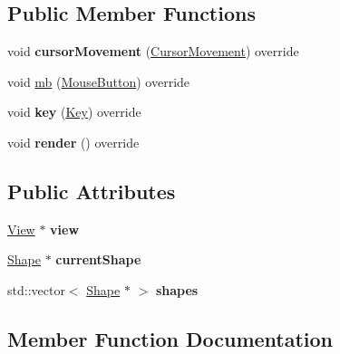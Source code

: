 \subsection*{Public Member Functions}
\begin{DoxyCompactItemize}
\item 
void {\bfseries cursor\+Movement} (\hyperlink{classCursorMovement}{Cursor\+Movement}) override\hypertarget{classComposer_a50e1533adec6e7b920d7092c1283f5b3}{}\label{classComposer_a50e1533adec6e7b920d7092c1283f5b3}

\item 
void \hyperlink{classComposer_aeccddfa85500c2e3a517058611ccca6a}{mb} (\hyperlink{classMouseButton}{Mouse\+Button}) override
\item 
void {\bfseries key} (\hyperlink{classKey}{Key}) override\hypertarget{classComposer_a7fd90a36ca6780fceb124c5770fa60f4}{}\label{classComposer_a7fd90a36ca6780fceb124c5770fa60f4}

\item 
void {\bfseries render} () override\hypertarget{classComposer_a7b26fe43793a77194d126d0244a4c25f}{}\label{classComposer_a7b26fe43793a77194d126d0244a4c25f}

\end{DoxyCompactItemize}
\subsection*{Public Attributes}
\begin{DoxyCompactItemize}
\item 
\hyperlink{classView}{View} $\ast$ {\bfseries view}\hypertarget{classComposer_a50e3d366ca34ba0ed9909e5007ec7945}{}\label{classComposer_a50e3d366ca34ba0ed9909e5007ec7945}

\item 
\hyperlink{classShape}{Shape} $\ast$ {\bfseries current\+Shape}\hypertarget{classComposer_a473d9d23e3ac014e491e811ccd7ee872}{}\label{classComposer_a473d9d23e3ac014e491e811ccd7ee872}

\item 
std\+::vector$<$ \hyperlink{classShape}{Shape} $\ast$ $>$ {\bfseries shapes}\hypertarget{classComposer_aab60ee3a7fb35ad8b4676c93f15553e1}{}\label{classComposer_aab60ee3a7fb35ad8b4676c93f15553e1}

\end{DoxyCompactItemize}


\subsection{Member Function Documentation}
